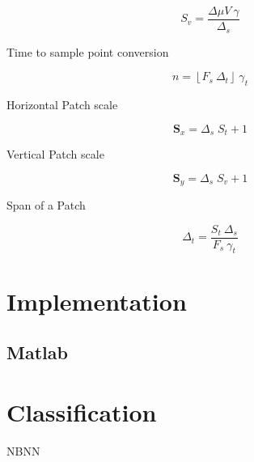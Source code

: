 \begin{equation}
S_v= \frac{\Delta \mu V \ \gamma}{\Delta_s} 
\label{eq:mapping1}
\end{equation}

Time to sample point conversion

\begin{equation}
n = \left\lfloor F_s \ \Delta_t \right\rfloor \ \gamma_t
\label{eq:mapping1}
\end{equation}

Horizontal Patch scale

\begin{equation}
\mathbf{S}_x = \Delta_s \; S_t + 1
\label{eq:mapping2}
\end{equation}

Vertical Patch scale

\begin{equation}
\mathbf{S}_y = \Delta_s \; S_v + 1
\label{eq:mapping1}
\end{equation}

Span of a Patch

\begin{equation}
\Delta_t = \frac{S_t \ \Delta_s}{F_s \ \gamma_t} 
\label{eq:mapping1}
\end{equation}


\section{Implementation}

\subsection{Matlab}

\section{Classification}

NBNN

